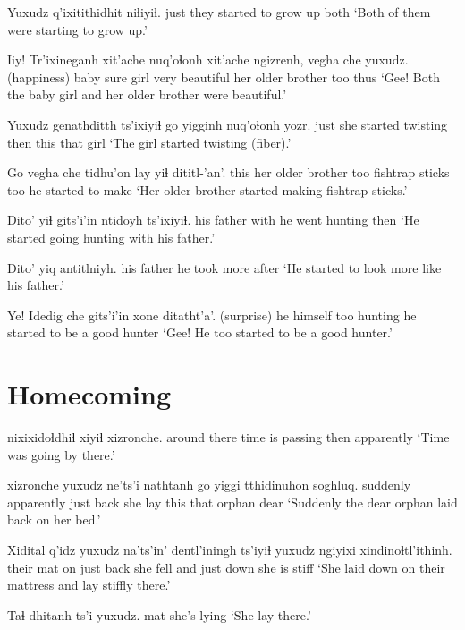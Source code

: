 \documentclass[12pt]{article}
\begin{document}
\gll Yuxudz q'ixitithidhit          niɬiyiɬ.
just   {they started to grow up} both
\glt `Both of them were starting to grow up.'
\glend

\gll Iiy! Tr'ixineganh xit'ache nuq'oɬonh xit'ache ngizrenh,  vegha             che yuxudz.
(happiness)  baby          sure     girl      very  beautiful {her older brother} too thus
\glt `Gee! Both the baby girl and her older brother were beautiful.'
\glend

\gll Yuxudz genathditth       ts'ixiyiɬ go   yigginh {nuq'oɬonh yozr. }
just     {she started twisting} then   this that   girl              
\glt `The girl started twisting (fiber).'
\glend

\gll Go   vegha             che tidhu'on lay    yiɬ dititl-'an'.
this {her older brother} too fishtrap sticks too {he started to make}
\glt `Her older brother started making fishtrap sticks.'
\glend

\gll Dito'      yiɬ {gits'i'in ntidoyh} ts'ixiyiɬ.
{his father} with {he went hunting} then
\glt `He started going hunting with his father.'
\glend

\gll Dito'      {yiq antitlniyh.}
{his father} {he took more after}
\glt `He started to look more like his father.'
\glend

\gll Ye! Idedig  che gits'i'in {xone ditatht'a'}.
(surprise) {he himself} too hunting   {he started to be a good hunter}
\glt `Gee! He too started to be a good hunter.'
\glend

\section*{Homecoming}

  nixixidoɬdhiɬ xiyiɬ xizronche.
{around there} {time is passing} then apparently
\glt `Time was going by there.'
\glend

 xizronche yuxudz ne'ts'i nathtanh go   yiggi tthidinuhon soghluq.
suddenly     apparently just back    {she lay} this that  orphan      dear
\glt `Suddenly the dear orphan laid back on her bed.'
\glend

\gll Xidital        q'idz yuxudz {na'ts'in'} dentl'iningh  ts'iyiɬ yuxudz ngiyixi   xindinoɬtl'ithinh.
{their mat} on    just   back {she fell} and  just     down {she is stiff} 
\glt `She laid down on their mattress and lay stiffly there.'
\glend

\gll Taɬ   dhitanh ts'i yuxudz.
mat {she's lying}
\glt `She lay there.'
\glend
\end{document}
